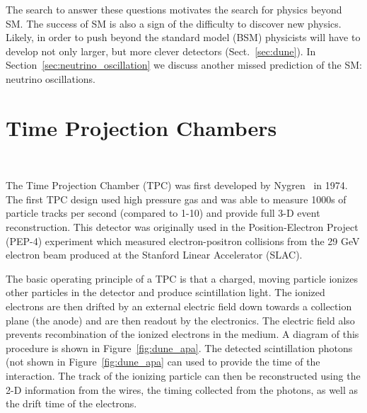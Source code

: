The search to answer these questions motivates the search for physics beyond SM.
The success of SM is also a sign of the difficulty to discover new physics.
Likely, in order to push beyond the standard model (BSM) physicists will have to develop not only larger, but more clever detectors (Sect.~\ref{sec:dune}).
In Section~\ref{sec:neutrino_oscillation} we discuss another missed prediction of the SM: neutrino oscillations. 

\section{Time Projection Chambers}~\label{sec:tpcs}

The Time Projection Chamber (TPC) was first developed by Nygren~\cite{lartpc:nygren} in 1974.
The first TPC design used high pressure gas and was able to measure 1000s of particle tracks per second (compared to 1-10) and provide full 3-D event reconstruction.
This detector was originally used in the Position-Electron Project (PEP-4) experiment which measured electron-positron collisions from the 29 GeV electron beam produced at the Stanford Linear Accelerator (SLAC).

The basic operating principle of a TPC is that a charged, moving particle ionizes other particles in the detector and produce scintillation light.
The ionized electrons are then drifted by an external electric field down towards a collection plane (the anode) and are then readout by the electronics.
The electric field also prevents recombination of the ionized electrons in the medium. 
A diagram of this procedure is shown in Figure~\ref{fig:dune_apa}.
The detected scintillation photons (not shown in Figure~\ref{fig:dune_apa} can used to provide the time of the interaction.
The track of the ionizing particle can then be reconstructed using the 2-D information from the wires, the timing collected from the photons, as well as the drift time of the electrons.

